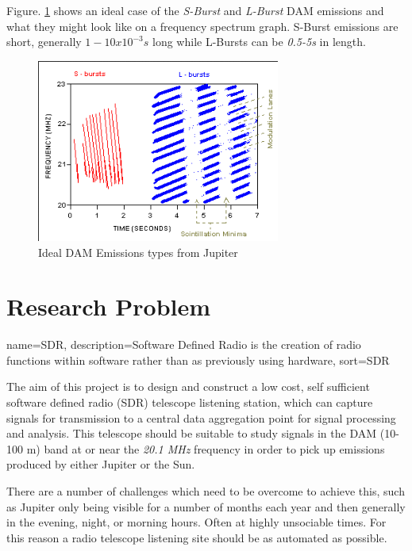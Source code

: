 \documentclass[runningheads,a4paper]{llncs}
\begin{document}
Figure. \ref{fig:dam_emissions_spectrum} shows an ideal case of the \textit{S-Burst} and \textit{L-Burst} \gls{DAM} emissions and what they might look like on a frequency spectrum graph. S-Burst emissions are short, generally $1-10x10^{-3}s$ long while L-Bursts can be \textit{0.5-5s} in length.

%
\begin{figure}[here]
\centering
\includegraphics[width=8cm]{images/05}
\caption{Ideal DAM Emissions types from Jupiter \citep{wilkinson94}}
\label{fig:dam_emissions_spectrum}
\end{figure}
%

%
\newpage
\section*{Research Problem}
%
{
  name={SDR},
  description={Software Defined Radio is the creation of radio functions within software rather than as previously using hardware},
  sort=SDR
}

The aim of this project is to design and construct a low cost, self sufficient software defined radio (\gls{SDR}) telescope listening station, which can capture signals for transmission to a central data aggregation point for signal processing and analysis. This telescope should be suitable to study signals  in the \gls{DAM} (10-100 m) band at or near the \textit{20.1 MHz} frequency in order to pick up emissions produced by either Jupiter or the Sun.

There are a number of challenges which need to be overcome to achieve this, such as Jupiter only being visible for a number of months each year and then generally in the evening, night, or morning hours. Often at highly unsociable times. For this reason a radio telescope listening site should be as automated as possible.
\end{document}

